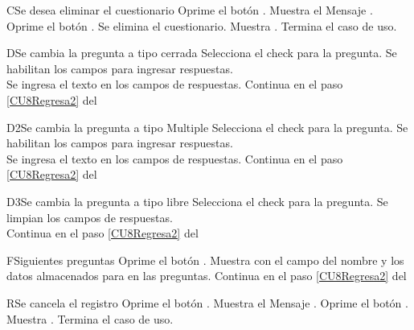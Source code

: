 \begin{UCtrayectoriaA}{C}{Se desea eliminar el cuestionario}
    \UCpaso[\UCactor] Oprime el botón .
    \UCpaso Muestra el Mensaje \textbf{}.
    \UCpaso[\UCactor] Oprime el botón . 
    \UCpaso Se elimina el cuestionario.
    \UCpaso Muestra .
    \UCpaso Termina el caso de uso.
\end{UCtrayectoriaA}

\begin{UCtrayectoriaA}{D}{Se cambia la pregunta a tipo cerrada}
    \UCpaso[\UCactor] Selecciona el check  para la pregunta.
    \UCpaso Se habilitan los campos para ingresar respuestas.
        \\
    \UCpaso Se ingresa el texto en los campos de respuestas.
    \UCpaso Continua en el paso \ref{CU8Regresa2} del 
\end{UCtrayectoriaA}

\begin{UCtrayectoriaA}{D2}{Se cambia la pregunta a tipo Multiple}
    \UCpaso[\UCactor] Selecciona el check  para la pregunta.
    \UCpaso Se habilitan los campos para ingresar respuestas.
        \\
    \UCpaso Se ingresa el texto en los campos de respuestas.
    \UCpaso Continua en el paso \ref{CU8Regresa2} del 
\end{UCtrayectoriaA}

\begin{UCtrayectoriaA}{D3}{Se cambia la pregunta a tipo libre}
    \UCpaso[\UCactor] Selecciona el check  para la pregunta.
    \UCpaso Se limpian los campos de respuestas.
        \\
    \UCpaso Continua en el paso \ref{CU8Regresa2} del 
\end{UCtrayectoriaA}

\begin{UCtrayectoriaA}{F}{Siguientes preguntas}
    \UCpaso[\UCactor] Oprime el botón .
    \UCpaso Muestra  con el campo del nombre y los datos almacenados para en las preguntas.
    \UCpaso Continua en el paso \ref{CU8Regresa2} del 
\end{UCtrayectoriaA}

\begin{UCtrayectoriaA}{R}{Se cancela el registro}
    \UCpaso[\UCactor] Oprime el botón .
    \UCpaso Muestra el Mensaje \textbf{}.
    \UCpaso[\UCactor] Oprime el botón . 
    \UCpaso Muestra .
    \UCpaso Termina el caso de uso.
\end{UCtrayectoriaA}

